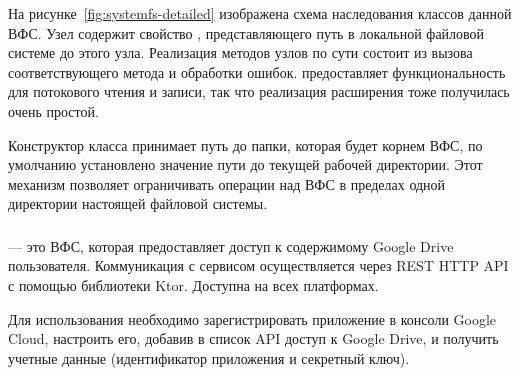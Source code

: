     На рисунке~\ref{fig:systemfs-detailed} изображена схема наследования классов данной ВФС. Узел  содержит свойство , представляющего путь в локальной файловой системе до этого узла. Реализация методов узлов по сути состоит из вызова соответствующего метода  и обработки ошибок.  предоставляет функциональность для потокового чтения и записи, так что реализация расширения  тоже получилась очень простой.

    Конструктор класса  принимает путь до папки, которая будет корнем ВФС, по умолчанию установлено значение пути до текущей рабочей директории. Этот механизм позволяет ограничивать операции над ВФС в пределах одной директории настоящей файловой системы.
    
  \subsubsection{}
     --- это ВФС, которая предоставляет доступ к содержимому Google Drive пользователя. Коммуникация с сервисом осуществляется через REST HTTP API с помощью библиотеки Ktor. Доступна на всех платформах.

    Для использования необходимо зарегистрировать приложение в консоли Google Cloud\cite{google-cloud}, настроить его, добавив в список API доступ к Google Drive, и получить учетные данные (идентификатор приложения и секретный ключ).


